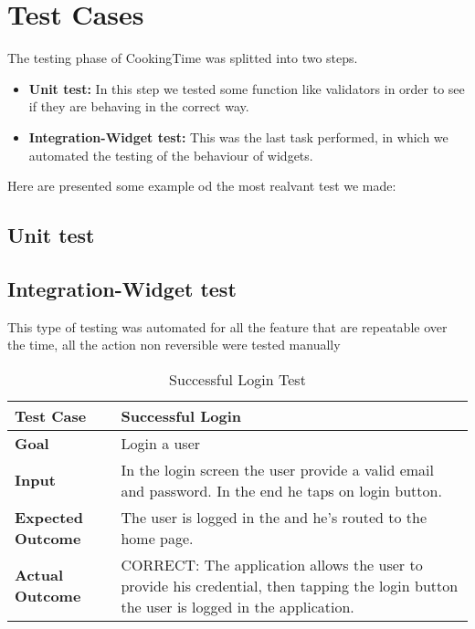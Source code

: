 \chapter{Test Cases}
The testing phase of CookingTime was splitted into two steps.

\begin{itemize}
	\item \textbf{Unit test:} In this step we tested some function like validators in order to see if they are behaving in the correct way.
	\item \textbf{Integration-Widget test:} This was the last task performed, in which we automated the testing of the behaviour of widgets.
\end{itemize}

Here are presented some example od the most realvant test we made:

\section{Unit test}

\section{Integration-Widget test}
This type of testing was automated for all the feature that are repeatable over the time, all the action non reversible were tested manually

\begin{table}[H]
	\centering
	\begin{tabular}{|l|l|}
	\hline
	\textbf{Test Case}& Successful Login\\
	\hline
	\textbf{Goal}& Login a user\\
	\hline
	\textbf{Input}& 
	\begin{minipage}{.7\linewidth}
	In the login screen the user provide a valid email and password. In the end he taps on login button.
	\end{minipage}\\
	\hline
	\textbf{Expected Outcome}& The user is logged in the and he's routed to the home page.\\
	\hline
	\textbf{Actual Outcome}& 
	\begin{minipage}{.7\linewidth}
	CORRECT: The application allows the user to provide his credential, then tapping the login button the user is logged in the application.
	\end{minipage}\\
	\hline	
	\end{tabular}
	\caption{Successful Login Test}
\end{table}

